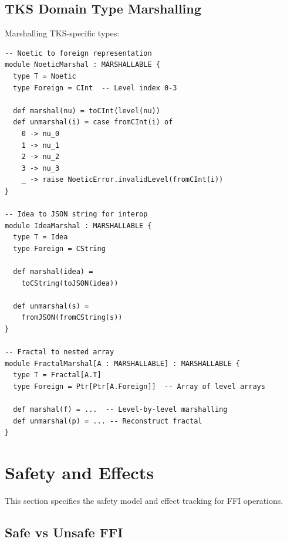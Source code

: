 \subsection{TKS Domain Type Marshalling}
\label{subsec:domain-marshalling}

\begin{definition}
\label{def:noetic-marshal}
Marshalling TKS-specific types:
\begin{verbatim}
-- Noetic to foreign representation
module NoeticMarshal : MARSHALLABLE {
  type T = Noetic
  type Foreign = CInt  -- Level index 0-3

  def marshal(nu) = toCInt(level(nu))
  def unmarshal(i) = case fromCInt(i) of
    0 -> nu_0
    1 -> nu_1
    2 -> nu_2
    3 -> nu_3
    _ -> raise NoeticError.invalidLevel(fromCInt(i))
}

-- Idea to JSON string for interop
module IdeaMarshal : MARSHALLABLE {
  type T = Idea
  type Foreign = CString

  def marshal(idea) =
    toCString(toJSON(idea))

  def unmarshal(s) =
    fromJSON(fromCString(s))
}

-- Fractal to nested array
module FractalMarshal[A : MARSHALLABLE] : MARSHALLABLE {
  type T = Fractal[A.T]
  type Foreign = Ptr[Ptr[A.Foreign]]  -- Array of level arrays

  def marshal(f) = ...  -- Level-by-level marshalling
  def unmarshal(p) = ... -- Reconstruct fractal
}
\end{verbatim}
\end{definition}

\section{Safety and Effects}
\label{sec:ffi-safety}

This section specifies the safety model and effect tracking for FFI operations.

\subsection{Safe vs Unsafe FFI}
\label{subsec:safe-unsafe}

